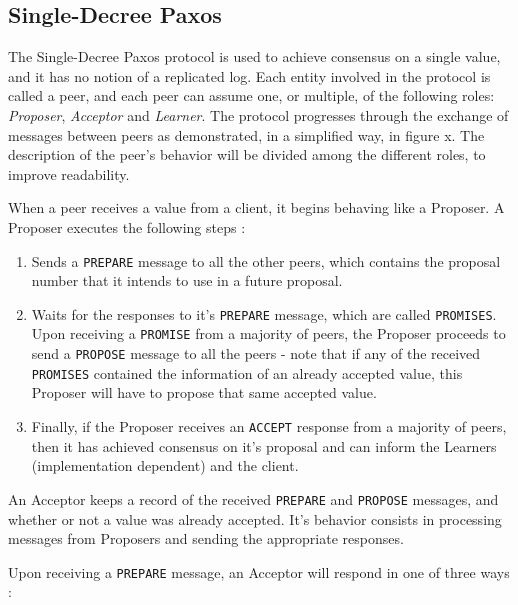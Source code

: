 \subsection{Single-Decree Paxos}

The Single-Decree Paxos protocol \cite{paxos_made_simple} is used to achieve consensus on a single value, and it has no notion of a replicated log. Each entity involved in the protocol is called a peer, and each peer can assume one, or multiple, of the following roles: \textit{Proposer}, \textit{Acceptor} and \textit{Learner}. The protocol progresses through the exchange of messages between peers as demonstrated, in a simplified way, in figure x.  The description of the peer’s behavior will be divided among the different roles, to improve readability.

When a peer receives a value from a client, it begins behaving like a Proposer. A Proposer executes the following steps \cite{paxos_made_simple}:

\begin{enumerate}
  \item Sends a \texttt{PREPARE} message to all the other peers, which contains the proposal number that it intends to use in a future proposal.
  \item Waits for the responses to it’s \texttt{PREPARE} message, which are called \texttt{PROMISES}. Upon receiving a \texttt{PROMISE} from a majority of peers, the Proposer proceeds to send a \texttt{PROPOSE} message to all the peers - note that if any of the received \texttt{PROMISES} contained the information of an already accepted value, this Proposer will have to propose that same accepted value.
  \item Finally, if the Proposer receives an \texttt{ACCEPT} response from a majority of peers, then it has achieved consensus on it’s proposal and can inform the Learners (implementation dependent) and the client.
\end{enumerate}

An Acceptor keeps a record of the received \texttt{PREPARE} and \texttt{PROPOSE} messages, and whether or not a value was already accepted. It’s behavior consists in processing messages from Proposers and sending the appropriate responses.

Upon receiving a \texttt{PREPARE} message, an Acceptor will respond in one of three ways \cite{paxos_made_simple}:

